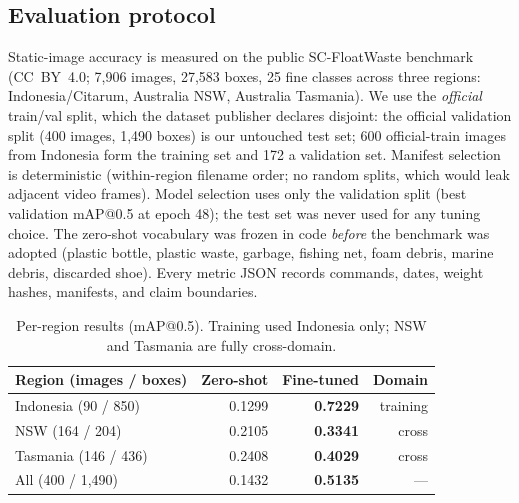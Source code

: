 \documentclass[conference]{IEEEtran}
\begin{document}
\subsection{Evaluation protocol}
Static-image accuracy is measured on the public SC-FloatWaste benchmark
(CC~BY~4.0; 7,906 images, 27,583 boxes, 25 fine classes across three
regions: Indonesia/Citarum, Australia NSW, Australia Tasmania). We use the
\emph{official} train/val split, which the dataset publisher declares
disjoint: the official validation split (400 images, 1,490 boxes) is our
untouched test set; 600 official-train images from Indonesia form the
training set and 172 a validation set. Manifest selection is deterministic
(within-region filename order; no random splits, which would leak adjacent
video frames). Model selection uses only the validation split (best
validation mAP@0.5 at epoch 48); the test set was never used for any tuning
choice. The zero-shot vocabulary was frozen in code \emph{before} the
benchmark was adopted (plastic bottle, plastic waste, garbage, fishing net,
foam debris, marine debris, discarded shoe). Every metric JSON records
commands, dates, weight hashes, manifests, and claim boundaries.

\begin{table}[t]
\caption{Per-region results (mAP@0.5). Training used Indonesia only; NSW
and Tasmania are fully cross-domain.}
\label{tab:regions}
\centering
\small
\begin{tabular}{lrrr}
\toprule
Region (images / boxes) & Zero-shot & Fine-tuned & Domain \\
\midrule
Indonesia (90 / 850) & 0.1299 & \textbf{0.7229} & training \\
NSW (164 / 204) & 0.2105 & \textbf{0.3341} & cross \\
Tasmania (146 / 436) & 0.2408 & \textbf{0.4029} & cross \\
\midrule
All (400 / 1,490) & 0.1432 & \textbf{0.5135} & --- \\
\bottomrule
\end{tabular}
\end{table}
\end{document}
